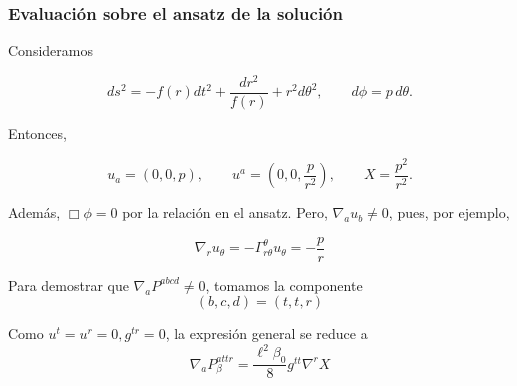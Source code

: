 \documentclass{beamer}
\newcommand{\CompactDisplaySpacing}{%
  \setlength{\abovedisplayskip}{2pt plus 1pt minus 1pt}%
  \setlength{\belowdisplayskip}{2pt plus 1pt minus 1pt}%
  \setlength{\abovedisplayshortskip}{0pt plus 1pt}%
  \setlength{\belowdisplayshortskip}{1pt plus 1pt}%
}
\begin{document}
\begin{frame}[label=nav-frame-119]
	\frametitle{Evaluación sobre el ansatz de la solución}
	\small
	\CompactDisplaySpacing

	Consideramos

	\[
	ds^2
	=
	-f(r)dt^2
	+
	\frac{dr^2}{f(r)}
	+
	r^2d\theta^2,
	\qquad
	d\phi=p\,d\theta.
	\]

	Entonces,

	\[
	u_a=(0,0,p),
	\qquad
	u^a=
	\left(
	0,0,\frac{p}{r^2}
	\right),
	\qquad
	\boxed{
		X=\frac{p^2}{r^2}
	}.
	\]

	Además, $\Box\phi=0$ por la relación en el ansatz. Pero, $\nabla_a u_b\neq0$, pues, por ejemplo,

	\[
	\nabla_r u_\theta
	=
	-\Gamma^\theta_{r\theta}u_\theta
	=
	-\frac{p}{r}
	\]

	Para demostrar que \(\nabla_aP^{abcd}\neq0\), tomamos la componente
	\[
	(b,c,d)=(t,t,r)
	\]

	Como $u^t=u^r=0, g^{tr}=0$, la expresión general se reduce a
	\[
	\boxed{
		\nabla_aP_\beta^{attr}
		=
		\frac{\ell^2\beta_0}{8}
		g^{tt}\nabla^rX
	}
	\]

\end{frame}
\end{document}
